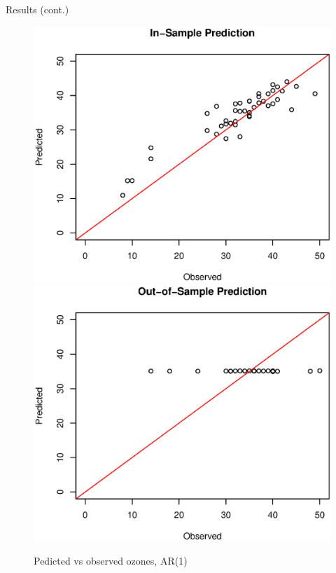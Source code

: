 \documentclass{beamer}
\begin{document}
\begin{frame}{Results (cont.)}
\begin{figure}
\centering
\includegraphics[scale = 0.35]{pred_in_ar.eps}
\includegraphics[scale = 0.35]{pred_out_ar.eps}
\caption{Pedicted vs observed ozones, AR(1)}
\end{figure}
\end{frame}
\end{document}

